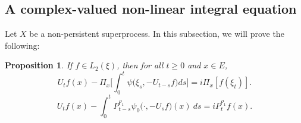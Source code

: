 \documentclass[12pt,a4paper]{amsart}
\theoremstyle{plain}
\newtheorem{prop}[thm]{Proposition}
\theoremstyle{definition}
\numberwithin{equation}{section}
\begin{document}
\subsection{A complex-valued non-linear integral equation}
Let $X$ be a non-persistent superprocess.
In this subsection, we will prove the following:
\begin{prop}
  \label{prop: complex FKPP-equation}
  If $f\in L_2(\xi)$,  then for all $t\geq 0$ and $x\in E$,
\begin{equation}
  \label{eq: complex FKPP-equation}
  U_tf(x) - \Pi_x \Big[\int_0^t \psi\big(\xi_s, - U_{t-s}f\big) ds \Big]
  = i \Pi_x [f(\xi_t)].
\end{equation}
\begin{equation}
  \label{eq: complex FKPP-equation with FK-transform}
  U_tf(x) -  \int_0^t P_{t-s}^{\rho_1} \psi_0\big(\cdot,-U_sf\big) (x)~ds
  = iP_t^{\rho_1} f(x).
\end{equation}
\end{prop}
\end{document}
